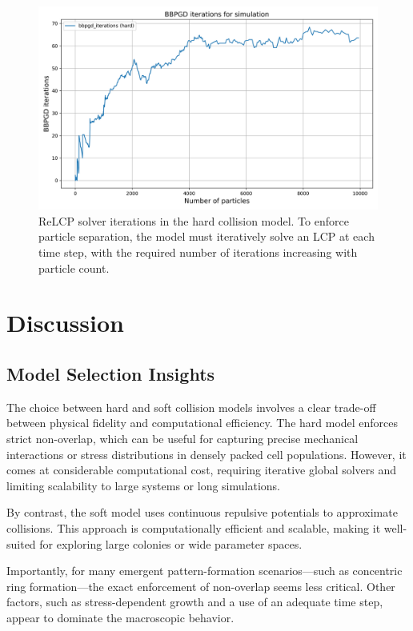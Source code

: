 \documentclass[conference]{IEEEtran}
\begin{document}
\begin{figure}[h]
    \centering
    \includegraphics[width=\linewidth]{figures/comparisons/bbpgd_iterations_simulation.png}
    \caption{ReLCP solver iterations in the hard collision model. To enforce particle separation, the model must iteratively solve an LCP at each time step, with the required number of iterations increasing with particle count.} \label{fig:bbpgd_iterations_simulation}
\end{figure}

\newpage
\clearpage

\section{Discussion}

\subsection{Model Selection Insights}

The choice between hard and soft collision models involves a clear trade-off between physical fidelity and computational efficiency.
The hard model enforces strict non-overlap, which can be useful for capturing precise mechanical interactions or stress distributions in densely packed cell populations. However, it comes at considerable computational cost, requiring iterative global solvers and limiting scalability to large systems or long simulations.

By contrast, the soft model uses continuous repulsive potentials to approximate collisions. This approach is computationally efficient and scalable, making it well-suited for exploring large colonies or wide parameter spaces.

Importantly, for many emergent pattern-formation scenarios—such as concentric ring formation—the exact enforcement of non-overlap seems less critical. Other factors, such as stress-dependent growth and a use of an adequate time step, appear to dominate the macroscopic behavior.
\end{document}
